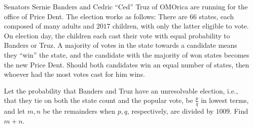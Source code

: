 Senators Sernie Banders and Cedric ``Ced'' Truz of OMOrica are running for the office of Price Dent. The election works as follows: There are $66$ states, each composed of many adults and $2017$ children, with only the latter eligible to vote. On election day, the children each cast their vote with equal probability to Banders or Truz. A majority of votes in the state towards a candidate means they ``win'' the state, and the candidate with the majority of won states becomes the new Price Dent. Should both candidates win an equal number of states, then whoever had the most votes cast for him wins.

Let the probability that Banders and Truz have an unresolvable election, i.e., that they tie on both the state count and the popular vote, be $\frac{p}{q}$ in lowest terms, and let $m, n$ be the remainders when $p, q$, respectively, are divided by $1009$. Find $m + n$.
